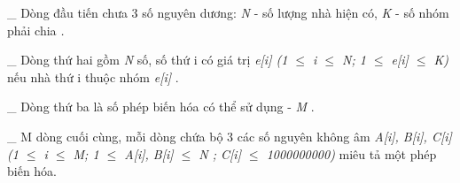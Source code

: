 \_ Dòng đầu tiến chưa 3 số nguyên dương:   \emph{    N   }   - số lượng nhà hiện có,   \emph{    K   }   - số nhóm phải chia   \emph{    .   }

   \_ Dòng thứ hai gồm   \emph{    N   }   số, số thứ i có giá trị   \emph{    e[i] (1  $\le$  i  $\le$  N; 1  $\le$  e[i]  $\le$  K)   }   nếu nhà thứ i thuộc nhóm   \emph{    e[i]   }   .  

   \_ Dòng thứ ba là số phép biến hóa có thể sử dụng -   \emph{    M   }   .  

   \_ M dòng cuối cùng, mỗi dòng chứa bộ 3 các số nguyên không âm   \emph{    A[i], B[i], C[i] (1  $\le$  i  $\le$  M; 1  $\le$  A[i], B[i]  $\le$  N ; C[i]  $\le$  1000000000)   }   miêu tả một phép biến hóa.